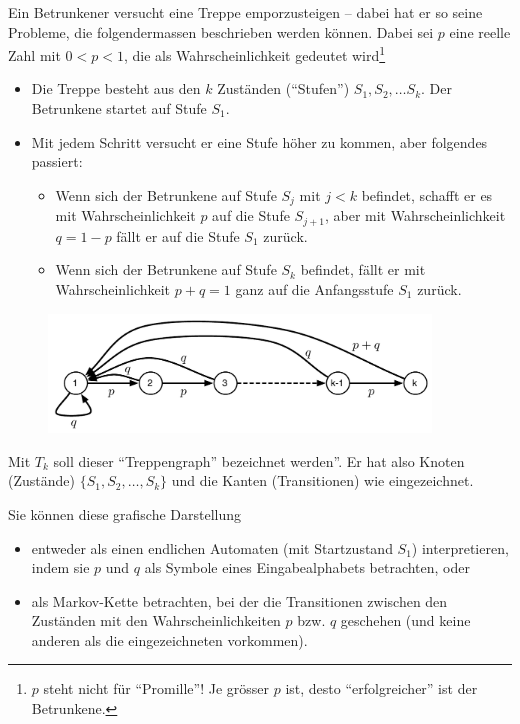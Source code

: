 Ein Betrunkener versucht eine Treppe emporzusteigen -- dabei hat er so seine
Probleme, die folgendermassen beschrieben werden können. Dabei sei $p$ eine
reelle Zahl mit $0<p<1$, die als Wahrscheinlichkeit gedeutet wird\footnote{ $p$
steht nicht für ``Promille''! Je grösser $p$ ist, desto ``erfolgreicher'' ist
der Betrunkene.}

\begin{itemize}
 \item Die Treppe besteht aus den $k$ Zuständen (``Stufen'') $S_1 ,S_2, \ldots
	 S_k$. Der Betrunkene startet auf Stufe $S_1$.
 \item Mit jedem Schritt versucht er eine Stufe höher zu kommen, aber folgendes
	 passiert:
       	\begin{itemize}
	\item Wenn sich der Betrunkene auf Stufe $S_j$ mit $j<k$ befindet,
		schafft er es mit Wahrscheinlichkeit $p$ auf die Stufe
		$S_{j+1}$, aber mit Wahrscheinlichkeit $q=1-p$ fällt er auf die
		Stufe $S_1$ zurück.
	\item Wenn sich der Betrunkene auf Stufe $S_k$  befindet, fällt er mit
		Wahrscheinlichkeit $p+q=1$ ganz auf die Anfangsstufe $S_1$
		zurück.
	\end{itemize}
\end{itemize}
\begin{figure}[htbp] %
   \centering
   \includegraphics[width=4in]{graphics/devilsgraph.pdf} 
\end{figure}
Mit $T_k$ soll dieser ``Treppengraph'' bezeichnet werden''. Er hat also Knoten
(Zustände) $\{S_1,S_2,\ldots,S_k\}$ und die Kanten (Transitionen) wie
eingezeichnet.

Sie können diese grafische Darstellung 
\begin{itemize}
\item
entweder als einen endlichen Automaten (mit Startzustand $S_1$) interpretieren,
indem sie $p$ und $q$ als Symbole eines Eingabealphabets betrachten, oder
\item
als Markov-Kette betrachten, bei der die Transitionen zwischen den Zuständen
mit den Wahrscheinlichkeiten $p$ bzw. $q$ geschehen (und keine anderen als die
eingezeichneten vorkommen).
\end{itemize}

